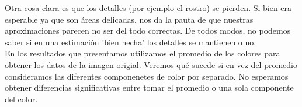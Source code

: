 


Otra cosa clara es que los detalles (por ejemplo el rostro) se pierden. Si bien era esperable ya que son áreas delicadas, nos da la pauta de que nuestras aproximaciones parecen no ser del todo correctas. De todos modos, no podemos saber si en una estimación 'bien hecha' los detalles se mantienen o no. \\


En los resultados que presentamos utilizamos el promedio de los colores para obtener los datos de la imagen origial. Veremos qué sucede si en vez del promedio consideramos las diferentes componenetes de color por separado. No esperamos obtener diferencias significativas entre tomar el promedio o una sola componente del color.




